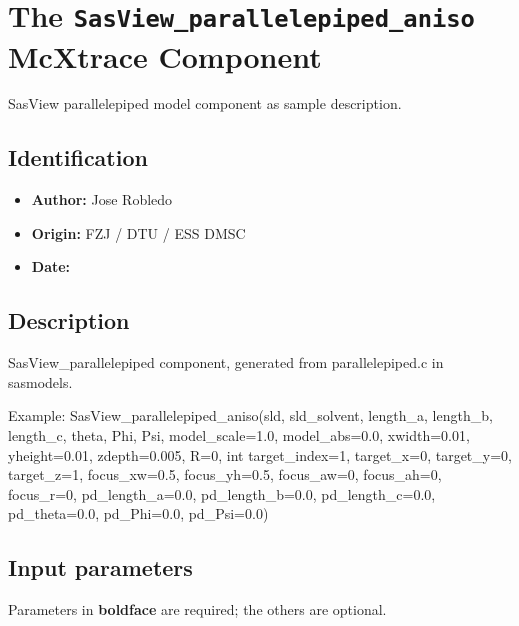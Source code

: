 \section{The \texttt{SasView\_parallelepiped\_aniso} McXtrace Component}
SasView parallelepiped model component as sample description.

\subsection*{Identification}
\begin{itemize}
  \item \textbf{Author:} Jose Robledo
  \item \textbf{Origin:} FZJ / DTU / ESS DMSC
  \item \textbf{Date:} 
\end{itemize}

\subsection*{Description}
SasView\_parallelepiped component, generated from parallelepiped.c in sasmodels.

Example: SasView\_parallelepiped\_aniso(sld, sld\_solvent, length\_a, length\_b, length\_c, theta, Phi, Psi, model\_scale=1.0, model\_abs=0.0, xwidth=0.01, yheight=0.01, zdepth=0.005, R=0, int target\_index=1, target\_x=0, target\_y=0, target\_z=1, focus\_xw=0.5, focus\_yh=0.5, focus\_aw=0, focus\_ah=0, focus\_r=0, pd\_length\_a=0.0, pd\_length\_b=0.0, pd\_length\_c=0.0, pd\_theta=0.0, pd\_Phi=0.0, pd\_Psi=0.0)

\subsection*{Input parameters}
Parameters in \textbf{boldface} are required; the others are optional.

